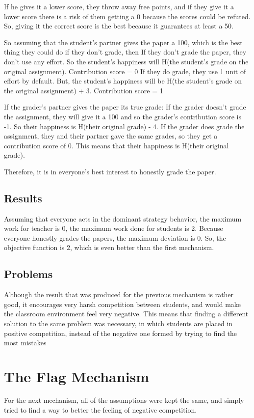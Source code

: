 \documentclass[12pt, Arial]{article}
\begin{document}
If he gives it a lower score, they throw away free points, and if they give it a lower score there is a risk of them getting a 0 because the scores could be refuted. So, giving it the correct score is the best because it guarantees at least a 50.

So assuming that the student's partner gives the paper a 100, which is the best thing they could do if they don't grade, then
	If they don't grade the paper, they don't use any effort. So the student's happiness will H(the student's grade on the original assignment). Contribution score = 0
	If they do grade, they use 1 unit of effort by default. But, the student's happiness will be H(the student's grade on the original assignment) + 3. Contribution score = 1
	
If the grader's partner gives the paper its true grade:
	If the grader doesn't grade the assignment, they will give it a 100 and so the grader's contribution score is -1. So their happiness is H(their original grade) - 4.
	If the grader does grade the assignment, they and their partner gave the same grades, so they get a contribution score of 0. This means that their happiness is H(their original grade). 
	
Therefore, it is in everyone's best interest to honestly grade the paper.

\subsection{Results}
Assuming that everyone acts in the dominant strategy behavior, the maximum work for teacher is 0, the maximum work done for students is 2. 
Because everyone honestly grades the papers, the maximum deviation is 0.
So, the objective function is 2, which is even better than the first mechanism.

\subsection{Problems}
Although the result that was produced for the previous mechanism is rather good, it encourages very harsh competition between students, and would make the classroom environment feel very negative. This means that finding a different solution to the same problem was necessary, in which students are placed in positive competition, instead of the negative one formed by trying to find the most mistakes

\section{The Flag Mechanism}
For the next mechanism, all of the assumptions were kept the same, and simply tried to find a way to better the feeling of negative competition.
\end{document}
